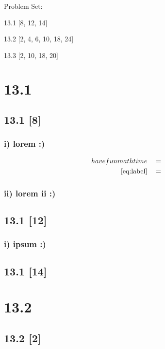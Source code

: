 \documentclass{article}
\begin{document}
{\large \noindent Problem Set:}

\par 13.1 [8, 12, 14]
\par 13.2 [2, 4, 6, 10, 18, 24]
\par 13.3 [2, 10, 18, 20]
\vspace{5mm}

\noindent \hrulefill

\section*{13.1}
\setcounter{equation}{0}

\subsection*{13.1 [8]}

\subsubsection*{i) lorem :)}

\begin{align}
    \label{eq:label}
    have fun math time && &=
    \\
    \label{eq:label2}
    \eqref{eq:label} && &=
\end{align}
\subsubsection*{ii) lorem ii :)}

\subsection*{13.1 [12]}

\subsubsection*{i) ipsum :)}

\subsection*{13.1 [14]}

\newpage

\section*{13.2}
\setcounter{equation}{0}

\subsection*{13.2 [2]}
\end{document}
